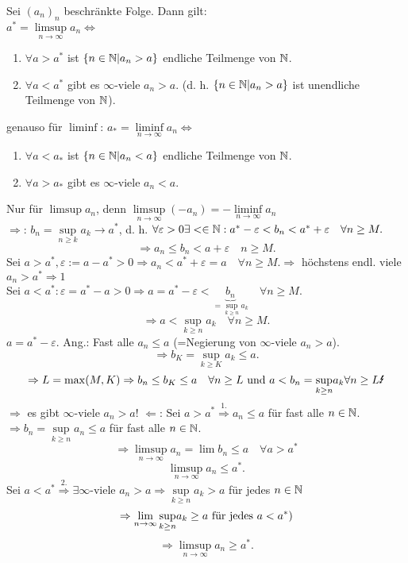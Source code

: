 \begin{satz}
	Sei \((a_n)_n\) beschränkte Folge. Dann gilt:\\
	\(a^* = \limsup\limits_{n\rightarrow\infty}a_n \Leftrightarrow \)
	\begin{enumerate}
		\item \(\forall a> a^* \) ist \( \{n\in\mathbb{N} |a_n>a \} \) endliche Teilmenge von \(\mathbb{N}\).
		\item \( \forall a<a^* \) gibt es \(\infty\)-viele \(a_n >a\). (d. h. \( \{ n\in\mathbb{N}|a_n>a \} \) ist unendliche Teilmenge von \(\mathbb{N}\)).
	\end{enumerate}
	genauso für \( \liminf \):
	\(a_* = \liminf\limits_{n\rightarrow\infty}a_n \Leftrightarrow \)
	\begin{enumerate}
		\item \(\forall a< a_* \) ist \( \{n\in\mathbb{N} |a_n<a \} \) endliche Teilmenge von \(\mathbb{N}\).
		\item \( \forall a>a_* \) gibt es \(\infty\)-viele \(a_n<a\).
	\end{enumerate}
\end{satz}
\begin{bew}
	Nur für \( \limsup a_n \), denn \( \limsup\limits_{n\rightarrow\infty}(-a_n) = -\liminf\limits_{n\rightarrow\infty} a_n \)\\
	\glqq\( \Rightarrow \)\grqq: \(b_n = \underset{n\geq k}{\sup}a_k \rightarrow a^* \), d. h. \( \forall \varepsilon>0\exists <\in\mathbb{N}: a^*-\varepsilon < b_n < a^* + \varepsilon \quad \forall n\geq M. \)\\
	\[ \Rightarrow a_n \leq b_n < a + \varepsilon \quad n\geq M. \]
	Sei \(  a>a^*, \varepsilon := a-a^* >0 \Rightarrow a_n < a^* + \varepsilon = a \quad \forall n\geq M. \Rightarrow \) höchstens endl. viele \( a_n >a^* \Rightarrow 1 \)\\
	Sei \( a< a^*: \varepsilon = a^*-a >0 \Rightarrow a=a^*-\varepsilon < \underbrace{b_n}_{=\underset{k\geq n}{\sup} a_k} \quad \forall n\geq M. \)\\
	\[ \Rightarrow a < \underset{k\geq n}{\sup} a_k \quad \forall n\geq M. \]
	\(a=a^* - \varepsilon \).
	Ang.: Fast alle \(a_n \leq a \) (=Negierung von \( \infty \)-viele \(a_n>a\)).\\
	\[ \Rightarrow b_K = \underset{k\geq K}{\sup} a_k \leq a. \]
	\[ \Rightarrow L = \max(M,K) \Rightarrow b_n \leq b_K \leq a \quad \forall n\geq L \text{ und } a<b_n=\underset{k\geq n}{\sup}a_k \forall n\geq L \text{\Lightning} \]
	\( \Rightarrow \) es gibt \(\infty\)-viele \(a_n>a\)!
	\glqq\( \Leftarrow \)\grqq: Sei \(a>a^* \overset{\text{1.}}{\Rightarrow} a_n \leq a \) für fast alle \(n\in\mathbb{N}\).\\
	\( \Rightarrow b_n = \underset{k\geq n}{\sup}a_n \leq a \) für fast alle \(n\in\mathbb{N}\).\\
	\[ \Rightarrow \limsup\limits_{n\rightarrow\infty} a_n = \lim b_n \leq a \quad \forall a> a^* \]
	\[ \limsup\limits_{n\rightarrow\infty} a_n \leq a^*. \]
	Sei \(a<a^* \overset{\text{2.}}{\Rightarrow} \exists \infty \)-viele \(a_n > a \Rightarrow \underset{k\geq n}{\sup} a_k > a \) für jedes \(n\in\mathbb{N}\) 
	\[ \Rightarrow \lim\limits_{n\rightarrow\infty}\underset{k\geq n}{\sup}a_k \geq a \text{ für jedes }a<a^*) \]
	\[ \Rightarrow \limsup\limits_{n\rightarrow\infty} a_n\geq a^*. \]
\end{bew}
